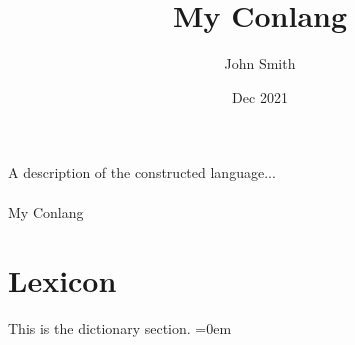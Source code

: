 \documentclass[12pt,a4paper,twoside]{article}
\begin{document}
\title{My Conlang}
\author{John Smith}
\date{Dec 2021}
\begin{titlepage}
\begin{center}
\vspace{10mm}
A description of the constructed language... \\
\vspace{40mm}
\textnormal{ \LARGE{\\}}
\vspace{10mm}
\fontsize{10mm}{7mm}\selectfont \textup{My Conlang}\\
\end{center}
\vspace{25mm}
\end{titlepage}
\tableofcontents

\clearpage
\thispagestyle{empty}
\section{Lexicon}
This is the dictionary section.
\clearpage
\pagestyle{fancy} %
\parindent=0em
\leftskip 0.1in
\parindent -0.1in
\end{document}
